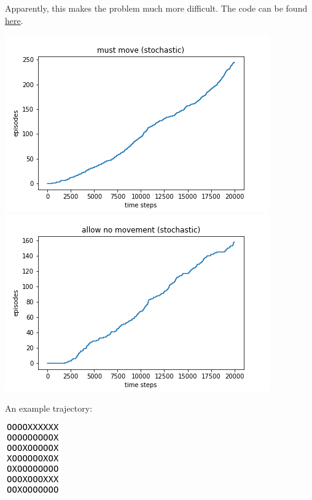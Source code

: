 \documentclass[12pt,a4paper]{article}
\begin{document}
\begin{enumerate}
Apparently, this makes the problem much more difficult. The code can be found \href{https://github.com/hannagabor/SBRL/blob/master/6.9/windy_gridworld.ipynb}{here}.

\begin{center}
  \includegraphics[scale=0.8]{stochastic_must_move_plot}
  \includegraphics[scale=0.8]{stochastic_no_movement_plot}
\end{center}

An example trajectory:
\begin{center}
\includegraphics[scale=0.8]{stochastic_trajectory}
\end{center}

\end{enumerate}
\end{document}
